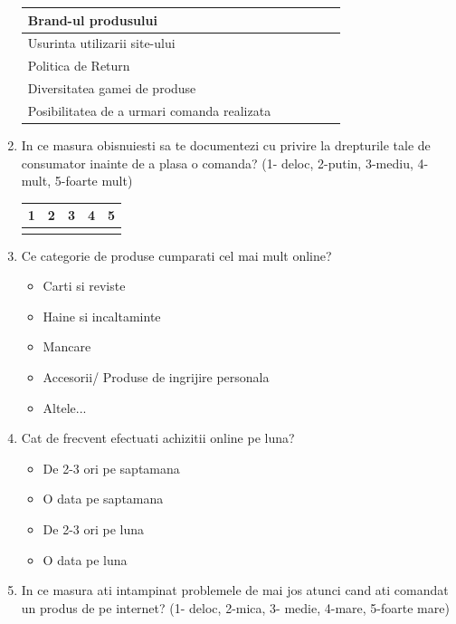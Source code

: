 \documentclass[a4paper, 12pt]{article}
\begin{document}
\begin{enumerate}
\begin{center}
\begin{tabular}{ | m{19em} | m{1cm}| m{1cm} | m{1cm}| m{1cm} | m{1cm} |}
			  Brand-ul produsului &  &  &  & & \\ 
			\hline
			 Usurinta utilizarii site-ului &  &   &  &  &\\ 
			\hline
		     Politica de Return&  &   &  & & \\ 
			\hline
			 Diversitatea gamei de produse&  &  &  & & \\ 
			\hline
			Posibilitatea de a urmari comanda realizata&  &  &  & & \\
			\hline
		\end{tabular}
\newline
	\end{center}
	\item In ce masura obisnuiesti sa te documentezi cu privire la drepturile tale de consumator inainte de a plasa o comanda?  (1- deloc, 2-putin, 3-mediu, 4-mult, 5-foarte mult)
	\begin{center}
		\begin{tabular}{ | m{3.5em} | m{1.5cm}| m{1.5cm} | m{1.5cm}| m{1.5cm} | } 
			\hline
			1 & 2 & 3 & 4 & 5 \\ 
			\hline
			  &  &  & &  \\
			\hline
		\end{tabular}
\newline
	\end{center}
	\item Ce categorie de produse cumparati cel mai mult online? 
	\begin{itemize}
		\item Carti si reviste
		\item Haine si incaltaminte
		\item Mancare
		\item Accesorii/ Produse de ingrijire personala
		\item Altele...
	\end{itemize}
	\item Cat de frecvent efectuati achizitii online pe luna? 
	\begin{itemize}
		\item De 2-3 ori pe saptamana
		\item O data pe saptamana
		\item De 2-3 ori pe luna
		\item O data pe luna
	\end{itemize}
	\item In ce masura ati intampinat problemele de mai jos atunci cand ati comandat un produs de pe internet? (1- deloc, 2-mica, 3- medie, 4-mare, 5-foarte mare)
	\begin{center}

\end{center}
\end{enumerate}
\end{document}
